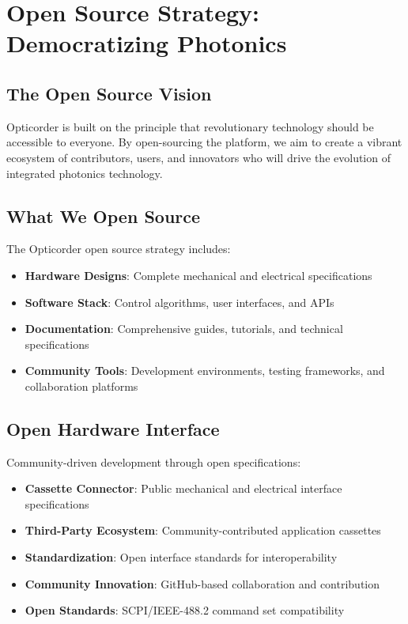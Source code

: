 \documentclass[11pt,a4paper]{article}
\begin{document}
\section{Open Source Strategy: Democratizing Photonics}

\subsection{The Open Source Vision}
Opticorder is built on the principle that revolutionary technology should be accessible to everyone. By open-sourcing the platform, we aim to create a vibrant ecosystem of contributors, users, and innovators who will drive the evolution of integrated photonics technology.

\subsection{What We Open Source}
The Opticorder open source strategy includes:
\begin{itemize}
\item \textbf{Hardware Designs}: Complete mechanical and electrical specifications
\item \textbf{Software Stack}: Control algorithms, user interfaces, and APIs
\item \textbf{Documentation}: Comprehensive guides, tutorials, and technical specifications
\item \textbf{Community Tools}: Development environments, testing frameworks, and collaboration platforms
\end{itemize}

\subsection{Open Hardware Interface}
Community-driven development through open specifications:
\begin{itemize}
\item \textbf{Cassette Connector}: Public mechanical and electrical interface specifications
\item \textbf{Third-Party Ecosystem}: Community-contributed application cassettes
\item \textbf{Standardization}: Open interface standards for interoperability
\item \textbf{Community Innovation}: GitHub-based collaboration and contribution
\item \textbf{Open Standards}: SCPI/IEEE-488.2 command set compatibility
\end{itemize}
\end{document}
